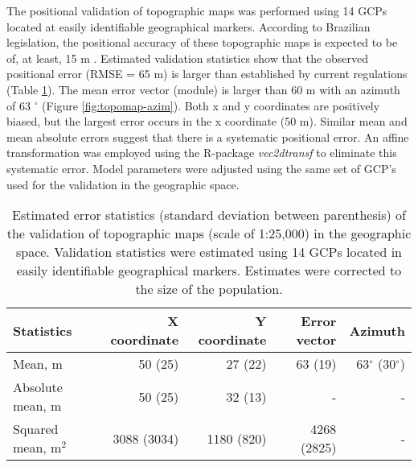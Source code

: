 The positional validation of topographic maps was performed using 14 GCPs located at easily identifiable geographical markers. According to Brazilian legislation, the positional accuracy of these topographic maps is expected to be of, at least, 15 m \cite{Brasil1984}. Estimated validation statistics show that the observed positional error (RMSE = 65 m) is larger than established by current regulations (Table \ref{tab:topomap-geo-val}). The mean error vector (module) is larger than 60 m with an azimuth of 63 $^{\circ}$ (Figure \ref{fig:topomap-azim}). Both x and y coordinates are positively biased, but the largest error occurs in the x coordinate (50 m). Similar mean and mean absolute errors suggest that there is a systematic positional error. An affine transformation was employed using the R-package \textit{vec2dtransf} \cite{Carrillo2012} to eliminate this systematic error. Model parameters were adjusted using the same set of GCP's used for the validation in the geographic space.

\begin{table}[ht]
  \caption{Estimated error statistics (standard deviation between parenthesis) of the validation of topographic maps (scale of 1:25,000) in the geographic space. Validation statistics were estimated using 14 GCPs located in easily identifiable geographical markers. Estimates were corrected to the size of the population.}
  \label{tab:topomap-geo-val}
  \centering
  {\small
  \begin{tabular}{lrrrr}
    \hline
    Statistics          & X coordinate & Y coordinate & Error vector & Azimuth                 \\
    \hline
    Mean, m             & 50   (25)    & 27   (22)    & 63   (19)    & 63$^\circ$ (30$^\circ$) \\ 
    Absolute mean, m    & 50   (25)    & 32   (13)    & -            & -                       \\ 
    Squared mean, m$^2$ & 3088 (3034)  & 1180 (820)   & 4268 (2825)  & -                       \\ 
    \hline
  \end{tabular}}
\end{table}


